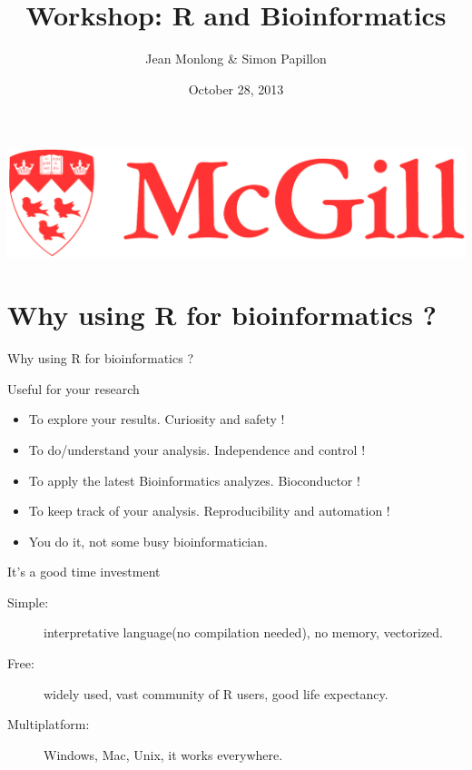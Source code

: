 \documentclass[10pt]{beamer}
\title{Workshop: R and Bioinformatics}
\author{Jean Monlong \& Simon Papillon}
\institute{Human Genetics department}
\date{October 28, 2013}
\begin{document}
\begin{frame}
  \titlepage
  \centering
  \includegraphics[page=1,height=.1\textheight]{imgs/McGill-Logo1.png}

\end{frame}

\section{Why using R for bioinformatics ?}

\begin{frame}[label=handout]{Why using R for bioinformatics ?}
\begin{block}{Useful for your research}
  \begin{itemize}
  \item To explore your results. Curiosity and safety !
  \item To do/understand your analysis. Independence and control !
  \item To apply the latest Bioinformatics analyzes. Bioconductor !
  \item To keep track of your analysis. Reproducibility and automation !
    \bigskip
  \item You do it, not some busy bioinformatician. 
  \end{itemize}
\end{block}
\begin{block}{It's a good time investment}
  \begin{description}
  \item[Simple:] interpretative language(no compilation needed), no memory, vectorized.
  \item[Free:] widely used, vast community of R users, good life expectancy.
  \item[Multiplatform:] Windows, Mac, Unix, it works everywhere.
  \end{description}
\end{block}
\end{frame}
\end{document}
